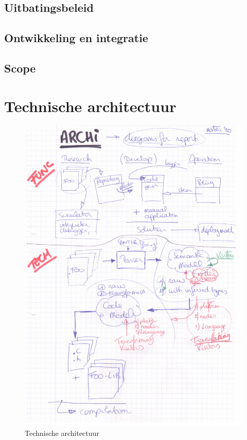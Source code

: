 \TODO

\subsection{Uitbatingsbeleid}
\label{subsection:arch-policy}

\TODO

\subsection{Ontwikkeling en integratie}
\label{subsection:arch-integration}

\TODO

\subsection{Scope}
\label{subsection:arch-scope}

\TODO

\section{Technische architectuur}
\label{section:arch-technical}

\TODO

\begin{figure}[ht]
  \centering
  \includegraphics[width=\linewidth]{resources/arch-technical.pdf}
  \caption{Technische architectuur}
  \label{fig:arch-technical}
\end{figure}

